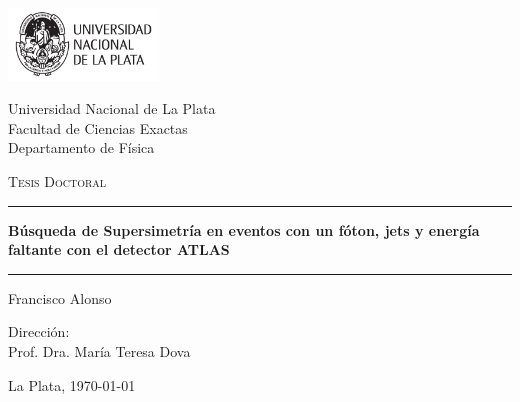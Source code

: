 \newcommand{\HRule}{\rule{\linewidth}{1pt}}

\begin{titlepage}
  \begin{center}

    \includegraphics[width=0.30\textwidth]{figures/logo_unlp.pdf}

    \vspace{0.5cm}

    {
      \large
      Universidad Nacional de La Plata \\[0.5cm]
      Facultad de Ciencias Exactas \\[0.5cm]
      Departamento de F\'isica
    }

    \vspace{1.5cm}


    \textsc{\Large Tesis Doctoral}\\[0.5cm]

    \HRule

    \vspace{0.4cm}

    {
      \huge \bfseries B\'usqueda de Supersimetr\'ia en eventos con un f\'oton,
      jets y energ\'ia faltante con el detector ATLAS\\[0.4cm]
    }

    \HRule

    \vspace{1.5cm}

    \noindent
    Francisco Alonso

    \vspace{1cm}

    Direcci\'on: \\
    Prof. Dra. Mar\'ia Teresa Dova

    \vfill

    {\large La Plata, \today}

  \end{center}
\end{titlepage}
